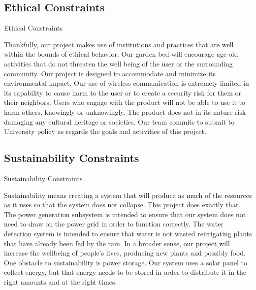 \subsection{Ethical Constraints}

Ethical Constraints

Thankfully, our project makes use of institutions and practices that are well within the bounds of ethical behavior. Our garden bed will encourage age old activities that do not threaten the well being of the user or the surrounding community. Our project is designed to accommodate and minimize its environmental impact. Our use of wireless communication is extremely limited in its capability to cause harm to the user or to create a security risk for them or their neighbors. Users who engage with the product will not be able to use it to harm others, knowingly or unknowingly. The product does not in its nature risk damaging any cultural heritage or societies. Our team commits to submit to University policy as regards the goals and activities of this project.

\subsection{Sustainability Constraints}

Sustainability Constraints

Sustainability means creating a system that will produce as much of the resources as it uses so that the system does not collapse. This project does exactly that. The power generation subsystem is intended to ensure that our system does not need to draw on the power grid in order to function correctly. The water detection system is intended to ensure that water is not wasted reirrigating plants that have already been fed by the rain. In a broader sense, our project will increase the wellbeing of people’s lives, producing new plants and possibly food.
One obstacle to sustainability is power storage. Our system uses a solar panel to collect energy, but that energy needs to be stored in order to distribute it in the right amounts and at the right times. 
